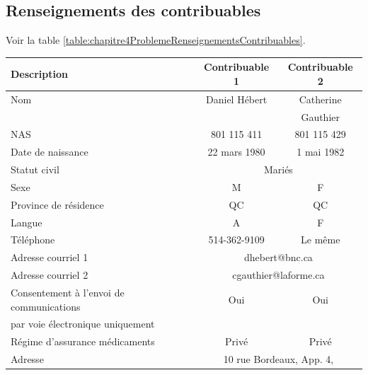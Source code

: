 \subsection{Renseignements des contribuables}
Voir la table \ref{table:chapitre4ProblemeRenseignementsContribuables}.
\begin{table}
	\centering
	\begin{tabular}{|l|c|c|}
		\hline
		\rowcolor{LightGreen} Description        & Contribuable 1 &        Contribuable 2        \\ \hline
		Nom                                      & Daniel Hébert  &          Catherine           \\
		                                         &                &           Gauthier           \\ \hline
		NAS                                      &  801 115 411   &         801 115 429          \\ \hline
		Date de naissance                        &  22 mars 1980  &       1\ier{} mai 1982       \\ \hline
		Statut civil                             &          \multicolumn{2}{c|}{Mariés}          \\ \hline
		Sexe                                     &       M        &              F               \\ \hline
		Province de résidence                    &       QC       &              QC              \\ \hline
		Langue                                   &       A        &              F               \\ \hline
		Téléphone                                &  514-362-9109  &           Le même            \\ \hline
		Adresse courriel 1                       &      \multicolumn{2}{c|}{dhebert@bnc.ca}      \\ \hline
		Adresse courriel 2                       &   \multicolumn{2}{c|}{cgauthier@laforme.ca}   \\ \hline
		Consentement à l'envoi de communications &      Oui       &             Oui              \\
		par voie électronique uniquement         &                &                              \\ \hline
		Régime d'assurance médicaments           &     Privé      &            Privé             \\ \hline
		Adresse                                  & \multicolumn{2}{c|}{10 rue Bordeaux, App. 4,} \\

\end{tabular}
\end{table}
